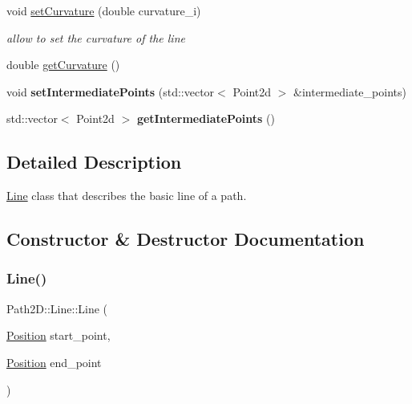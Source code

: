 \begin{DoxyCompactItemize}
\mbox{\label{class_path2_d_1_1_line_a48ff293e67c6dffbb1485b1afc8fcda2}} 
void \mbox{\hyperlink{class_path2_d_1_1_line_a48ff293e67c6dffbb1485b1afc8fcda2}{set\+Curvature}} (double curvature\+\_\+i)
\begin{DoxyCompactList}\small\item\em allow to set the curvature of the line \end{DoxyCompactList}\item 
double \mbox{\hyperlink{class_path2_d_1_1_line_aa02fa9c098cae2cf5931c443d828bd38}{get\+Curvature}} ()
\item 
\mbox{\label{class_path2_d_1_1_line_a79e141bbfcc0d5c83d95d33cc3bee9c8}} 
void {\bfseries set\+Intermediate\+Points} (std\+::vector$<$ Point2d $>$ \&intermediate\+\_\+points)
\item 
\mbox{\label{class_path2_d_1_1_line_a8c0a2b1c0907f4dc38fa42f61aa18542}} 
std\+::vector$<$ Point2d $>$ {\bfseries get\+Intermediate\+Points} ()
\end{DoxyCompactItemize}


\subsection{Detailed Description}
\mbox{\hyperlink{class_path2_d_1_1_line}{Line}} class that describes the basic line of a path. 

\subsection{Constructor \& Destructor Documentation}
\mbox{\label{class_path2_d_1_1_line_a090e0982e8ad1fdc2cb2af716cda408c}} 
\subsubsection{\texorpdfstring{Line()}{Line()}}
{\footnotesize\ttfamily Path2\+D\+::\+Line\+::\+Line (\begin{DoxyParamCaption}\item[{\mbox{\hyperlink{class_path2_d_1_1_position}{Position}}}]{start\+\_\+point,  }\item[{\mbox{\hyperlink{class_path2_d_1_1_position}{Position}}}]{end\+\_\+point }\end{DoxyParamCaption})}



